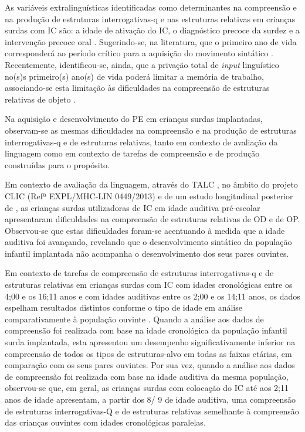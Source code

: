 \documentclass[output=paper,colorlinks,citecolor=brown,booklanguage=portuguese]{langscibook}
\begin{document}
As variáveis extralinguísticas identificadas como determinantes na compreensão e na produção de estruturas interrogativas-q e nas estruturas relativas em crianças surdas com IC são: a idade de ativação do IC, o diagnóstico precoce da surdez e a intervenção precoce oral \citep{Friedmann2006, Szterman2015}. Sugerindo-se, na literatura, que o primeiro ano de vida corresponderá ao período crítico para a aquisição do movimento sintático \citep{Friedmann2015}. Recentemente, identificou-se, ainda, que a privação total de \emph{input} linguístico no(s)s primeiro(s) ano(s) de vida poderá limitar a memória de trabalho, associando-se esta limitação às dificuldades na compreensão de estruturas relativas de objeto \citep{Volpato2020}.

Na aquisição e desenvolvimento do PE em crianças surdas implantadas, obser\-vam-se as mesmas dificuldades na compreensão e na produção de estruturas interrogativas-q e de estruturas relativas, tanto em contexto de avaliação da linguagem como em contexto de tarefas de compreensão e de produção construídas para o propósito.

Em contexto de avaliação da linguagem, através do TALC \citep{SuaKay2011}, no âmbito do projeto CLIC (Refª EXPL/MHC-LIN 0449/2013) e de um estudo longitudinal posterior de \citep{Lynce2019a}, as crianças surdas utilizadoras de IC em idade auditiva pré-escolar apresentaram dificuldades na compreensão de estruturas relativas de OD e de OP. Observou-se que estas dificuldades foram-se acentuando à medida que a idade auditiva foi avançando, revelando que o desenvolvimento sintático da população infantil implantada não acompanha o desenvolvimento dos seus pares ouvintes.

Em contexto de tarefas de compreensão de estruturas interrogativas-q e de estruturas relativas em crianças surdas com IC com idades cronológicas entre os 4;00 e os 16;11 anos e com idades auditivas entre os 2;00 e os 14;11 anos, os dados espelham resultados distintos conforme o tipo de idade em análise comparativamente à população ouvinte \citep{Moita2018, Moita2019}. Quando a análise aos dados de compreensão foi realizada com base na idade cronológica da população infantil surda implantada, esta apresentou um desempenho significativamente inferior na compreensão de todos os tipos de estruturas-alvo em todas as faixas etárias, em comparação com os seus pares ouvintes. Por sua vez, quando a análise aos dados de compreensão foi realizada com base na idade auditiva da mesma população, observou-se que, em geral, as crianças surdas com colocação do IC até aos 2;11 anos de idade apresentam, a partir dos 8/ 9 de idade auditiva, uma compreensão de estruturas interrogativas-Q e de estruturas relativas semelhante à compreensão das crianças ouvintes com idades cronológicas paralelas.
\end{document}
